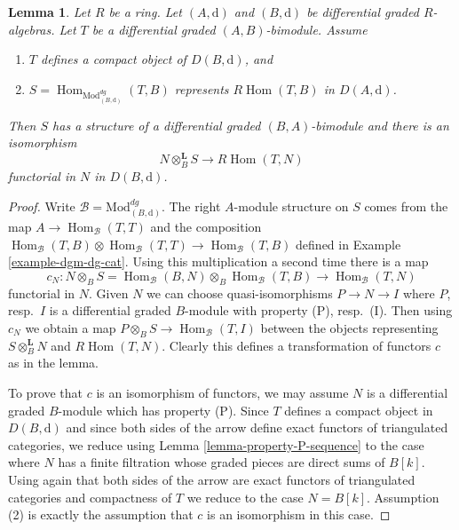 \documentclass{stacks-project}
\theoremstyle{plain}
\newtheorem{lemma}[subsection]{Lemma}
\theoremstyle{definition}
\theoremstyle{remark}
\numberwithin{equation}{subsection}
\def\Hom{\mathop{\mathrm{Hom}}\nolimits}
\begin{document}
\begin{lemma}
\label{lemma-RHom-is-tensor}
Let $R$ be a ring.
Let $(A, \text{d})$ and $(B, \text{d})$ be differential graded $R$-algebras.
Let $T$ be a differential graded $(A, B)$-bimodule.
Assume
\begin{enumerate}
\item $T$ defines a compact object of $D(B, \text{d})$, and
\item $S = \Hom_{\text{Mod}^{dg}_{(B, \text{d})}}(T, B)$
represents $R\Hom(T, B)$ in $D(A, \text{d})$.
\end{enumerate}
Then $S$ has a structure of a differential graded $(B, A)$-bimodule
and there is an isomorphism
$$
N \otimes_B^\mathbf{L} S \longrightarrow R\Hom(T, N)
$$
functorial in $N$ in $D(B, \text{d})$.
\end{lemma}

\begin{proof}
Write $\mathcal{B} = \text{Mod}^{dg}_{(B, \text{d})}$.
The right $A$-module structure on $S$ comes from the map
$A \to \Hom_\mathcal{B}(T, T)$ and the composition
$\Hom_\mathcal{B}(T, B) \otimes \Hom_\mathcal{B}(T, T)
\to \Hom_\mathcal{B}(T, B)$ defined in Example \ref{example-dgm-dg-cat}.
Using this multiplication a second time there is a map
$$
c_N :
N \otimes_B S = \Hom_\mathcal{B}(B, N) \otimes_B \Hom_\mathcal{B}(T, B)
\longrightarrow
\Hom_\mathcal{B}(T, N)
$$
functorial in $N$. Given $N$ we can choose quasi-isomorphisms
$P \to N \to I$ where $P$, resp.\ $I$ is a differential graded $B$-module
with property (P), resp.\ (I). Then using $c_N$ we obtain a map
$P \otimes_B S \to \Hom_\mathcal{B}(T, I)$ between the objects
representing $S \otimes_B^\mathbf{L} N$ and $R\Hom(T, N)$.
Clearly this defines a transformation of functors $c$ as in the lemma.

\medskip\noindent
To prove that $c$ is an isomorphism of functors, we may
assume $N$ is a differential graded $B$-module which
has property (P). Since $T$ defines a compact object in
$D(B, \text{d})$ and since both sides of the arrow define
exact functors of triangulated categories, we reduce using
Lemma \ref{lemma-property-P-sequence}
to the case where $N$ has a finite filtration whose
graded pieces are direct sums of $B[k]$. Using again that
both sides of the arrow are exact functors of triangulated
categories and compactness of $T$ we reduce to
the case $N = B[k]$. Assumption (2) is exactly the
assumption that $c$ is an isomorphism in this case.
\end{proof}
\end{document}
